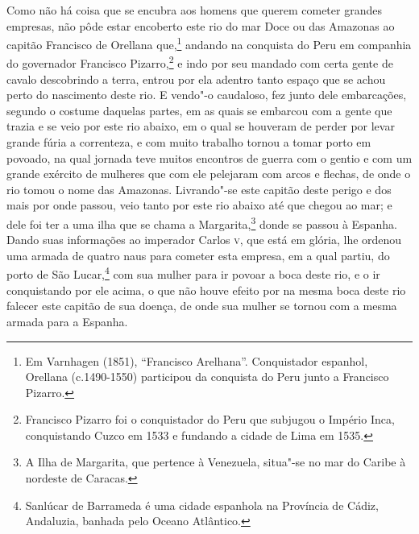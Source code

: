 Como não há coisa que se encubra aos homens que querem cometer grandes empresas, não pôde
estar encoberto este rio do mar Doce ou das Amazonas ao capitão Francisco de Orellana
que,\footnote{ Em Varnhagen (1851), ``Francisco Arelhana''. Conquistador espanhol,
Orellana (c.1490-1550) participou da conquista do Peru junto a Francisco Pizarro.} andando
na conquista do Peru em companhia do governador Francisco Pizarro,\footnote{ Francisco
Pizarro foi o conquistador do Peru que subjugou o Império Inca, conquistando Cuzco em 1533
e fundando a cidade de Lima em 1535.} e indo por seu mandado com certa gente de cavalo
descobrindo a terra, entrou por ela adentro tanto espaço que se achou perto do nascimento
deste rio. E vendo"-o caudaloso, fez junto dele embarcações, segundo o costume daquelas
partes, em as quais se embarcou com a gente que trazia e se veio por este rio abaixo, em o
qual se houveram de perder por levar grande fúria a correnteza, e com muito trabalho
tornou a tomar porto em povoado, na qual jornada teve muitos encontros de guerra com o
gentio e com um grande exército de mulheres que com ele pelejaram com arcos e flechas, de
onde o rio tomou o nome das Amazonas. Livrando"-se este capitão deste perigo e dos mais por
onde passou, veio tanto por este rio abaixo até que chegou ao mar; e dele foi ter a uma
ilha que se chama a Margarita,\footnote{ A Ilha de Margarita, que pertence à Venezuela,
situa"-se no mar do Caribe à nordeste de Caracas.} donde se passou à Espanha. Dando suas
informações ao imperador Carlos \textsc{v}, que está em glória, lhe ordenou uma armada de
quatro naus para cometer esta empresa, em a qual partiu, do porto de São Lucar,\footnote{
Sanlúcar de Barrameda é uma cidade espanhola na Província de Cádiz, Andaluzia, banhada
pelo Oceano Atlântico.} com sua mulher para ir povoar a boca deste rio, e o ir
conquistando por ele acima, o que não houve efeito por na mesma boca deste rio falecer
este capitão de sua doença, de onde sua mulher se tornou com a mesma armada para a
Espanha.

